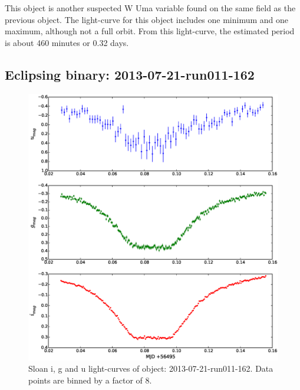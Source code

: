 This object is another suspected {W Uma} variable found on the same field as the previous object. The light-curve for this object includes one minimum and one maximum, although not a full orbit. From this light-curve, the estimated period is about 460 minutes or 0.32 days.

\subsection{Eclipsing binary: 2013-07-21-run011-162}
  
\begin{figure}
  \center
  \includegraphics[width=120mm]{images/2013-07-21-run011-162_lightcurve-bin8.eps}
  \caption{Sloan i, g and u light-curves of object: 2013-07-21-run011-162. Data points are binned by a factor of 8.}
  \label{fig:2013-07-21-run011-162}
\end{figure}

